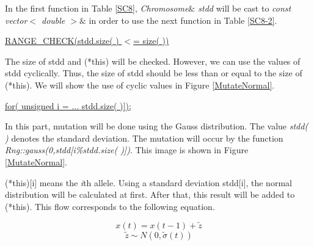 \documentclass[twocolumn]{article}
\begin{document}
\noindent
In the first function in Table \ref{SC8}, {\em Chromosome$\&$ stdd} will
be cast to {\em const vector$<$ double $>$$\&$} in order to use the
next function in Table \ref{SC8-2}.

\vspace{2mm}

\noindent
\underline{RANGE\_CHECK(stdd.size( ) $<$= size( ))}

\noindent
The size of stdd and (*this) will be checked. However, we can use the
values of stdd cyclically. Thus, the size of stdd should be less than
or equal to the size of (*this). We will show the use of cyclic values
in Figure \ref{MutateNormal}.

\vspace*{2mm}

\noindent
\underline{for( unsigned i = ... stdd.size( )]);}

\noindent
In this part, mutation will be done using the Gauss distribution. The
value {\em stdd( )} denotes the standard deviation. The mutation will
occur by the function {\em Rng::gauss(0,stdd[i\%stdd.size( )])}. This
image is shown in Figure \ref{MutateNormal}.

\vspace*{2mm}

\noindent
(*this)[i] means the {\em i}th allele. Using a standard deviation
stdd[i], the normal distribution will be calculated at first. After that,
this result will be added to (*this). This flow corresponds to the
following equation.

\begin{equation}
x(t) = x(t-1) + \tilde{z}
\end{equation}
\begin{equation}
\tilde{z} \sim N(0,\tilde{\sigma}(t))
\end{equation}
\end{document}
